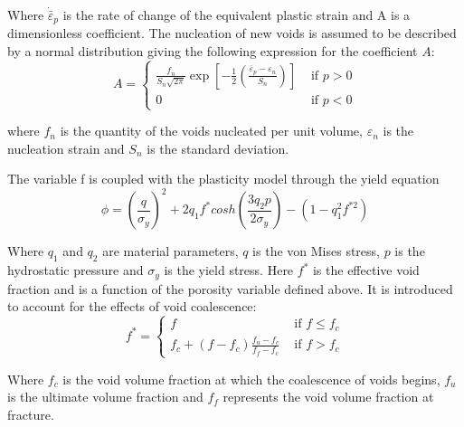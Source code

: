 \documentclass[sn-mathphys,Numbered,draft]{sn-jnl}%
\begin{document}
Where ${\dot{\bar{\varepsilon}}}_p$ is the rate of change of the equivalent plastic strain and A is a dimensionless coefficient.
The nucleation of new voids is assumed to be described by a normal distribution \cite{chu_void_1980} giving the following expression for the coefficient $A$:
\begin{equation}
\label{eqn:nucleatonA}
A= \begin{cases}\frac{f_n}{S_n \sqrt{2 \pi}} \exp \left[-\frac{1}{2}\left(\frac{\bar{\varepsilon}_p-\varepsilon_n}{S_n}\right)\right] & \text { if } p>0 \\ 0 & \text { if } p<0\end{cases}
\end{equation}

where $f_n$ is the quantity of the voids nucleated per unit volume, $\varepsilon_n$ is the nucleation strain and $S_n$ is the standard deviation. 


The variable f is coupled with the plasticity model through the yield equation 
\begin{equation}
	\phi=\left(\frac{q}{\sigma_y}\right)^2+2q_1f^\ast cosh\left(\frac{3q_2p}{2\sigma_y}\right)-\left(1-q_1^2f^{\ast2}\right)
\end{equation}

Where $q_1$ and $q_2$ are material parameters, $q$ is the von Mises stress, $p$ is the hydrostatic pressure and $\sigma_y$ is the yield stress.
Here $f^\ast$ is the effective void fraction and is a function of the porosity variable defined above. It is introduced to account for the effects of void coalescence:
\begin{equation}
\label{eqn:GTNCoalescence}
f^*=\left\{\begin{array}{cc}
f & \text { if } f \leq f_c \\
f_c+\left(f-f_c\right) \frac{f_u-f_c}{f_f-f_c} & \text { if } f>f_c
\end{array}\right.
\end{equation}

Where $f_c$ is the void volume fraction at which the coalescence of voids begins,  $f_u$ is the ultimate volume fraction and $f_f$ represents the void volume fraction at fracture.

\end{document}
